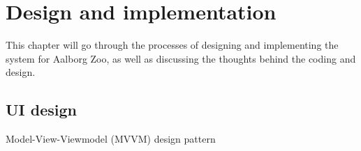 \chapter{Design and implementation}
This chapter will go through the processes of designing and implementing the system for Aalborg Zoo, as well as discussing the thoughts behind the coding and design.








\section{UI design}
Model-View-Viewmodel (MVVM) design pattern